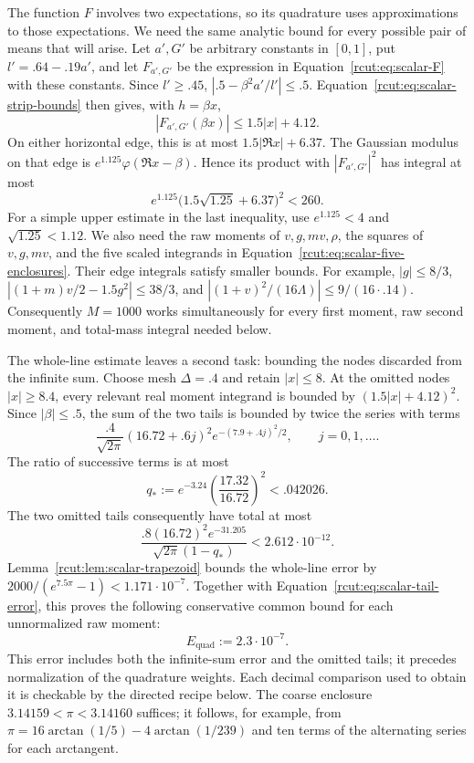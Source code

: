 The function \(F\) involves two expectations, so its quadrature uses
approximations to those expectations. We need the same analytic bound
for every possible pair of means that will arise. Let \(a',G'\) be
arbitrary constants in \([0,1]\), put \(l'=.64-.19a'\), and let
\(F_{a',G'}\) be the expression in Equation~\eqref{rcut:eq:scalar-F}
with these constants. Since \(l'\geq.45\),
\(|.5-\beta^2a'/l'|\leq.5\). Equation~\eqref{rcut:eq:scalar-strip-bounds}
then gives, with \(h=\beta x\),
\begin{equation}
 |F_{a',G'}(\beta x)|\leq1.5|x|+4.12.
 \label{rcut:eq:scalar-strip-F}
\end{equation}
On either horizontal edge, this is at most \(1.5|\Re x|+6.37\).
The Gaussian modulus on that edge is
\(e^{1.125}\varphi(\Re x-\beta)\). Hence its product with
\(|F_{a',G'}|^2\) has integral at most
\[
 e^{1.125}\bigl(1.5\sqrt{1.25}+6.37\bigr)^2<260.
\]
For a simple upper estimate in the last inequality, use
\(e^{1.125}<4\) and \(\sqrt{1.25}<1.12\).
We also need the raw moments of \(v,g,mv,\rho\), the squares of
\(v,g,mv\), and the five scaled integrands in
Equation~\eqref{rcut:eq:scalar-five-enclosures}. Their edge integrals
satisfy smaller bounds. For example, \(|g|\leq8/3\),
\(|(1+m)v/2-1.5g^2|\leq38/3\), and
\(|(1+v)^2/(16\Lambda{})|\leq9/(16\cdot.14)\).
Consequently \(M=1000\) works simultaneously for every first moment,
raw second moment, and total-mass integral needed below.

The whole-line estimate leaves a second task: bounding the nodes
discarded from the infinite sum. Choose mesh \(\Delta=.4\) and retain
\(|x|\leq8\). At the omitted nodes \(|x|\geq8.4\), every relevant
real moment integrand is bounded by \((1.5|x|+4.12)^2\).
Since \(|\beta|\leq.5\), the sum of the two tails is bounded by twice
the series with terms
\[
 \frac{.4}{\sqrt{2\pi}}(16.72+.6j)^2
                e^{-(7.9+.4j)^2/2},\qquad j=0,1,\ldots.
\]
The ratio of successive terms is at most
\[
 q_*:=e^{-3.24}\left(\frac{17.32}{16.72}\right)^2<.042026.
\]
The two omitted tails consequently have total at most
\begin{equation}
 \frac{.8(16.72)^2 e^{-31.205}}{\sqrt{2\pi}(1-q_*)}
 <2.612\cdot10^{-12}.
 \label{rcut:eq:scalar-tail-error}
\end{equation}
Lemma~\ref{rcut:lem:scalar-trapezoid} bounds the whole-line error by
\(2000/(e^{7.5\pi}-1)<1.171\cdot10^{-7}\).
Together with Equation~\eqref{rcut:eq:scalar-tail-error}, this proves the
following conservative common bound for each unnormalized raw moment:
\begin{equation}
 E_{\mathrm{quad}}:=2.3\cdot10^{-7}.
 \label{rcut:eq:scalar-raw-error}
\end{equation}
This error includes both the infinite-sum error and the omitted tails;
it precedes normalization of the quadrature weights. Each decimal
comparison used to obtain it is checkable by the directed recipe below.
The coarse enclosure
\(3.14159<\pi<3.14160\) suffices; it follows, for example, from
\(\pi=16\arctan(1/5)-4\arctan(1/239)\) and ten terms of the
alternating series for each arctangent.


